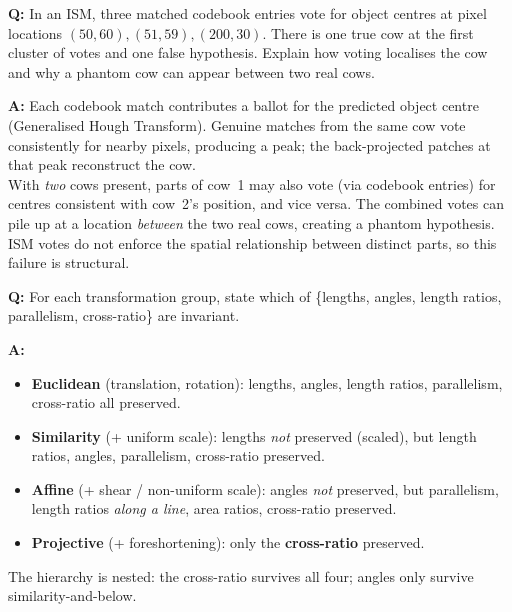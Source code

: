 \begin{exbox}
\textbf{Q:} In an ISM, three matched codebook entries vote for object centres at pixel locations $(50,60), (51,59), (200,30)$. There is one true cow at the first cluster of votes and one false hypothesis. Explain how voting localises the cow and why a phantom cow can appear between two real cows.

\textbf{A:} Each codebook match contributes a ballot for the predicted object centre (Generalised Hough Transform). Genuine matches from the same cow vote consistently for nearby pixels, producing a peak; the back-projected patches at that peak reconstruct the cow. \\
With \emph{two} cows present, parts of cow~1 may also vote (via codebook entries) for centres consistent with cow~2's position, and vice versa. The combined votes can pile up at a location \emph{between} the two real cows, creating a phantom hypothesis. ISM votes do not enforce the spatial relationship between distinct parts, so this failure is structural.
\end{exbox}

\begin{exbox}
\textbf{Q:} For each transformation group, state which of \{lengths, angles, length ratios, parallelism, cross-ratio\} are invariant.

\textbf{A:}
\begin{itemize}
  \item \textbf{Euclidean} (translation, rotation): lengths, angles, length ratios, parallelism, cross-ratio all preserved.
  \item \textbf{Similarity} (+ uniform scale): lengths \emph{not} preserved (scaled), but length ratios, angles, parallelism, cross-ratio preserved.
  \item \textbf{Affine} (+ shear / non-uniform scale): angles \emph{not} preserved, but parallelism, length ratios \emph{along a line}, area ratios, cross-ratio preserved.
  \item \textbf{Projective} (+ foreshortening): only the \textbf{cross-ratio} preserved.
\end{itemize}
The hierarchy is nested: the cross-ratio survives all four; angles only survive similarity-and-below.
\end{exbox}

